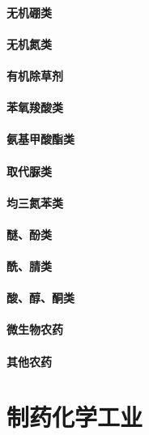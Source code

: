 \documentclass[UTF8]{../../ApplicationUniverse}
\begin{document}
        \subsubsection{无机硼类}
        \subsubsection{无机氮类}
    \subsubsection{有机除草剂}
        \subsubsection{苯氧羧酸类}
        \subsubsection{氨基甲酸酯类}
        \subsubsection{取代脲类}
        \subsubsection{均三氮苯类}
        \subsubsection{醚、酚类}
        \subsubsection{酰、腈类}
        \subsubsection{酸、醇、酮类}
\subsubsection{微生物农药}
\subsubsection{其他农药}










\chapter{制药化学工业}
\end{document}
